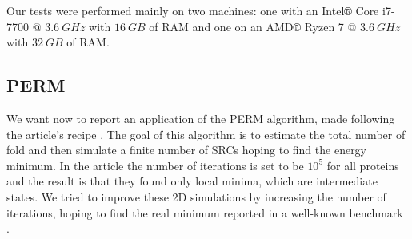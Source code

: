 Our tests were performed mainly on two machines: one with an Intel® Core i7-7700 @ $3.6 \ GHz$ with $16 \ GB$ of RAM and one on an AMD® Ryzen 7 @ $3.6 \ GHz$ with $32 \ GB$ of RAM.
\subsection{PERM}
We want now to report an application of the PERM algorithm, made following the article's recipe \cite{PERM}.
The goal of this algorithm is to estimate the total number of fold and then simulate a finite number of SRCs hoping to find the energy minimum.
In the article the number of iterations is set to be $10^5$ for all proteins and the result is that they found only local minima, which are intermediate states.
We tried to improve these 2D simulations by increasing the number of iterations, hoping to find the real minimum reported in a well-known benchmark \cite{bench}.


